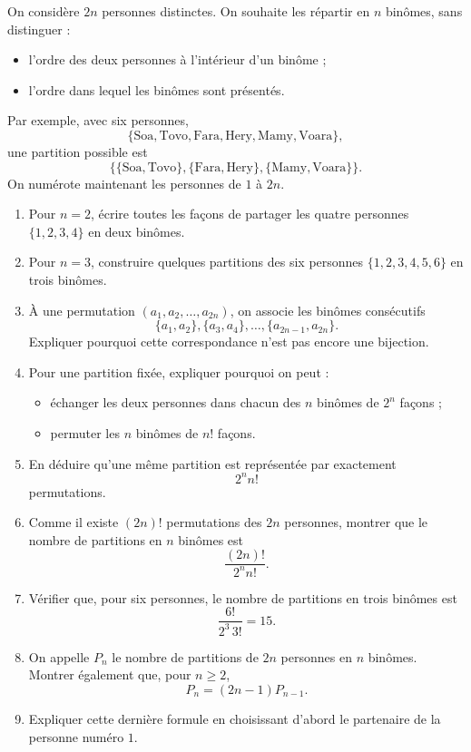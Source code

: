 On considère $2n$ personnes distinctes. On souhaite les répartir en $n$
binômes, sans distinguer :
\begin{itemize}
  \item l'ordre des deux personnes à l'intérieur d'un binôme ;
  \item l'ordre dans lequel les binômes sont présentés.
\end{itemize}
Par exemple, avec six personnes,
\[
\{\text{Soa}, \text{Tovo}, \text{Fara}, \text{Hery}, \text{Mamy}, \text{Voara}\},
\]
une partition possible est
\[
\{\{\text{Soa}, \text{Tovo}\}, \{\text{Fara}, \text{Hery}\}, \{\text{Mamy}, \text{Voara}\}\}.
\]
On numérote maintenant les personnes de $1$ à $2n$.
\begin{enumerate}
  \item Pour $n = 2$, écrire toutes les façons de partager les quatre
  personnes $\{1, 2, 3, 4\}$ en deux binômes.
  \item Pour $n = 3$, construire quelques partitions des six personnes
  $\{1, 2, 3, 4, 5, 6\}$ en trois binômes.
  \item À une permutation $(a_1, a_2, \ldots, a_{2n})$, on associe les binômes
  consécutifs
  \[
  \{a_1, a_2\}, \{a_3, a_4\}, \ldots, \{a_{2n-1}, a_{2n}\}.
  \]
  Expliquer pourquoi cette correspondance n'est pas encore une bijection.
  \item Pour une partition fixée, expliquer pourquoi on peut :
  \begin{itemize}
    \item échanger les deux personnes dans chacun des $n$ binômes de $2^n$
    façons ;
    \item permuter les $n$ binômes de $n!$ façons.
  \end{itemize}
  \item En déduire qu'une même partition est représentée par exactement
  \[
  2^n n!
  \]
  permutations.
  \item Comme il existe $(2n)!$ permutations des $2n$ personnes, montrer que
  le nombre de partitions en $n$ binômes est
  \[
  \frac{(2n)!}{2^n n!}.
  \]
  \item Vérifier que, pour six personnes, le nombre de partitions en trois
  binômes est
  \[
  \frac{6!}{2^3\, 3!} = 15.
  \]
  \item On appelle $P_n$ le nombre de partitions de $2n$ personnes en $n$
  binômes. Montrer également que, pour $n \ge 2$,
  \[
  P_n = (2n - 1) P_{n-1}.
  \]
  \item Expliquer cette dernière formule en choisissant d'abord le partenaire
  de la personne numéro $1$.
\end{enumerate}
